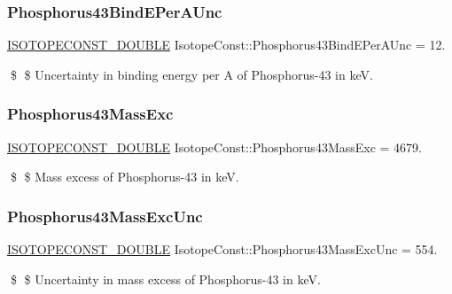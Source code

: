\subsubsection{\texorpdfstring{Phosphorus43\+Bind\+E\+Per\+A\+Unc}{Phosphorus43BindEPerAUnc}}
{\footnotesize\ttfamily \mbox{\hyperlink{group___isotope_const-_macros_ga8f45a7272ce02c0b4c65c44636ed719a}{I\+S\+O\+T\+O\+P\+E\+C\+O\+N\+S\+T\+\_\+\+D\+O\+U\+B\+LE}} Isotope\+Const\+::\+Phosphorus43\+Bind\+E\+Per\+A\+Unc = 12.}

\$ \$ Uncertainty in binding energy per A of Phosphorus-\/43 in keV. \mbox{\label{group___isotope_const-_phosphorus-_p43_gad7d8943e927ded71259681f4cb0fb027}} 
\subsubsection{\texorpdfstring{Phosphorus43\+Mass\+Exc}{Phosphorus43MassExc}}
{\footnotesize\ttfamily \mbox{\hyperlink{group___isotope_const-_macros_ga8f45a7272ce02c0b4c65c44636ed719a}{I\+S\+O\+T\+O\+P\+E\+C\+O\+N\+S\+T\+\_\+\+D\+O\+U\+B\+LE}} Isotope\+Const\+::\+Phosphorus43\+Mass\+Exc = 4679.}

\$ \$ Mass excess of Phosphorus-\/43 in keV. \mbox{\label{group___isotope_const-_phosphorus-_p43_ga469c02688b1a164b3dbc49ee5272a1e0}} 
\subsubsection{\texorpdfstring{Phosphorus43\+Mass\+Exc\+Unc}{Phosphorus43MassExcUnc}}
{\footnotesize\ttfamily \mbox{\hyperlink{group___isotope_const-_macros_ga8f45a7272ce02c0b4c65c44636ed719a}{I\+S\+O\+T\+O\+P\+E\+C\+O\+N\+S\+T\+\_\+\+D\+O\+U\+B\+LE}} Isotope\+Const\+::\+Phosphorus43\+Mass\+Exc\+Unc = 554.}

\$ \$ Uncertainty in mass excess of Phosphorus-\/43 in keV. \mbox{\label{group___isotope_const-_phosphorus-_p43_gac6fcfcac2bde42f5a840f2ce040bd14a}} 
